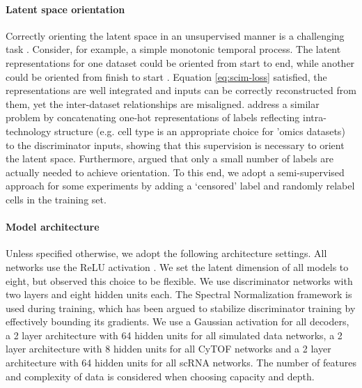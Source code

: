 \paragraph{Latent space orientation}
Correctly orienting the latent space in an unsupervised manner is a challenging task \cite{locatello2019a, yang2019a}.
Consider, for example, a simple monotonic temporal process.
The latent representations for one dataset could be oriented from start to end, while another could be oriented from finish to start \cite{welch2017}.
Equation \ref{eq:scim-loss} satisfied, the representations are well integrated and inputs can be correctly reconstructed from them, yet the inter-dataset relationships are misaligned.
\citet{makhzani2015} address a similar problem by concatenating one-hot representations of labels reflecting intra-technology structure (e.g. cell type is an appropriate choice for ’omics datasets) to the discriminator inputs, showing that this supervision is necessary to orient the latent space.
Furthermore, \citet{locatello2019} argued that only a small number of labels are actually needed to achieve orientation.
To this end, we adopt a semi-supervised approach for some experiments by adding a ‘censored’ label and randomly relabel cells in the training set.

\paragraph{Model architecture}
Unless specified otherwise, we adopt the following architecture settings.
All networks use the ReLU activation \cite{agarap2019}.
We set the latent dimension of all models to eight, but observed this choice to be flexible.
We use discriminator networks with two layers and eight hidden units each.
The Spectral Normalization framework \cite{miyato2018} is used during training, which has been argued to stabilize discriminator training by effectively bounding its gradients.
We use a Gaussian activation for all decoders, a 2 layer architecture with 64 hidden units for all simulated data networks, a 2 layer architecture with 8 hidden units for all CyTOF networks and a 2 layer architecture with 64 hidden units for all scRNA networks.
The number of features and complexity of data is considered when choosing capacity and depth.

